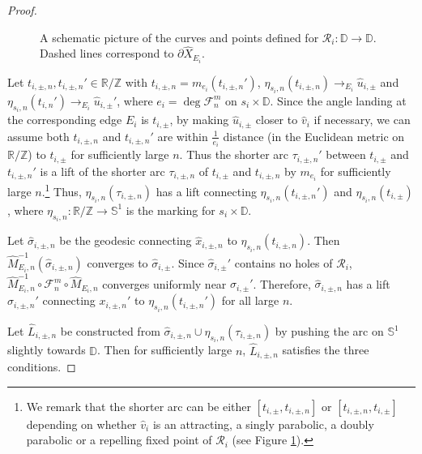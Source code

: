 \documentclass[11pt, reqno]{amsart}
\newcommand{\incfig}[1]{%
    \def\svgwidth{\columnwidth}
    {#1.pdf_tex}
}
\numberwithin{equation}{section}
\theoremstyle{plain}
\theoremstyle{theorem}
\theoremstyle{definition}
\newcommand{\R}{\mathbb{R}}
\newcommand{\Z}{\mathbb{Z}}
\newcommand{\D}{\mathbb{D}}
\newcommand{\bp}{\mathcal{F}}
\newcommand{\rl}{\mathcal{R}}
\numberwithin{figure}{section}
\begin{document}
\begin{proof}
\begin{figure}[ht]
  \centering
  \resizebox{0.8\linewidth}{!}{
  \incfig{LID}
  }
  \caption{A schematic picture of the curves and points defined for $\rl_i: \D\rightarrow\D$. Dashed lines correspond to $\partial \hat{X}_{E_i}$.}
  \label{fig:LID}
\end{figure}

Let $t_{i,\pm,n}, t_{i,\pm,n}' \in \R/\Z$ with $t_{i, \pm, n} = m_{e_i}(t_{i,\pm,n}')$, $\eta_{s_i,n}(t_{i,\pm,n}) \to_{E_i} \hat u_{i, \pm}$ and $\eta_{s_i,n}(t_{i,n}') \to_{E_i} \hat u_{i, \pm}'$, where $e_i = \deg \mathcal{F}_n^m$ on $s_i\times \D$.
Since the angle landing at the corresponding edge $E_i$ is $t_{i, \pm}$,
by making $\hat u_{i,\pm}$ closer to $\hat v_i$ if necessary, we can assume both $t_{i,\pm, n}$ and $t_{i,\pm, n}'$ are within $\frac{1}{e_i}$ distance (in the Euclidean metric on $\R/\Z$) to $t_{i, \pm}$ for sufficiently large $n$.
Thus the shorter arc $\tau_{i, \pm,n}'$ between $t_{i,\pm}$ and $t_{i, \pm, n}'$ is a lift of the shorter arc $\tau_{i, \pm,n}$ of $t_{i,\pm}$ and $t_{i, \pm, n}$ by $m_{e_i}$ for sufficiently large $n$.\footnote{We remark that the shorter arc can be either $[t_{i,\pm}, t_{i, \pm, n}]$ or $[t_{i,\pm,n}, t_{i, \pm}]$ depending on whether $\hat v_i$ is an attracting, a singly parabolic, a doubly parabolic or a repelling fixed point of $\rl_i$ (see Figure \ref{fig:LID}).}
Thus, $\eta_{s_i,n}(\tau_{i,\pm,n})$ has a lift connecting $\eta_{s_i,n}(t_{i,\pm,n}')$ and $\eta_{s_i,n}(t_{i,\pm})$, where $\eta_{s_i,n}: \R/\Z \longrightarrow \mathbb{S}^1$ is the marking for $s_i \times \D$.

Let $\hat{\sigma}_{i, \pm, n}$ be the geodesic connecting $\hat x_{i,\pm,n}$ to $\eta_{s_i,n}(t_{i,\pm,n})$.
Then $\hat M_{E_i, n}^{-1}(\hat{\sigma}_{i,\pm,n})$ converges to $\hat{\sigma}_{i,\pm}$.
Since $\hat{\sigma}_{i,\pm}'$ contains no holes of $\rl_i$, $\hat M_{E_i, n}^{-1} \circ \bp_n^m \circ \hat M_{E_i, n}$ converges uniformly near $\hat{\sigma}_{i,\pm}'$.
Therefore, $\hat{\sigma}_{i, \pm, n}$ has a lift $\hat{\sigma}_{i, \pm, n}'$ connecting $x_{i,\pm,n}'$ to $\eta_{s_i,n}(t_{i,\pm,n}')$ for all large $n$.

Let $\hat L_{i,\pm,n}$ be constructed from $\hat{\sigma}_{i,\pm,n}\cup \eta_{s_i,n}(\tau_{i,\pm,n})$ by pushing the arc on $\mathbb{S}^1$ slightly towards $\D$.
Then for sufficiently large $n$, $\hat L_{i,\pm,n}$ satisfies the three conditions.
\end{proof}
\end{document}
